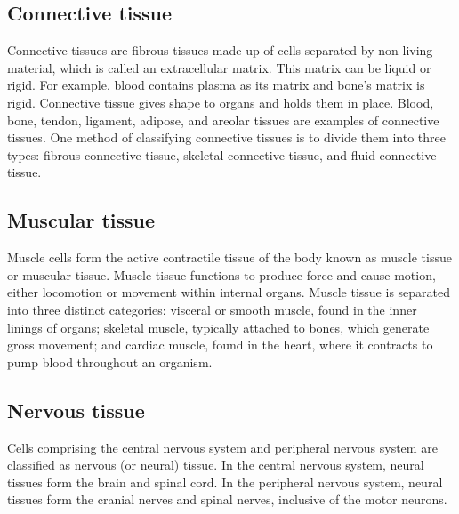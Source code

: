 \hypertarget{connective-tissue}{%
\subsection{Connective tissue}\label{connective-tissue}}

Connective tissues are fibrous tissues made up of cells separated by non-living material, which is called an extracellular matrix. This matrix can be liquid or rigid. For example, blood contains plasma as its matrix and bone's matrix is rigid. Connective tissue gives shape to organs and holds them in place. Blood, bone, tendon, ligament, adipose, and areolar tissues are examples of connective tissues. One method of classifying connective tissues is to divide them into three types: fibrous connective tissue, skeletal connective tissue, and fluid connective tissue.

\hypertarget{muscular-tissue}{%
\subsection{Muscular tissue}\label{muscular-tissue}}

Muscle cells form the active contractile tissue of the body known as muscle tissue or muscular tissue. Muscle tissue functions to produce force and cause motion, either locomotion or movement within internal organs. Muscle tissue is separated into three distinct categories: visceral or smooth muscle, found in the inner linings of organs; skeletal muscle, typically attached to bones, which generate gross movement; and cardiac muscle, found in the heart, where it contracts to pump blood throughout an organism.

\hypertarget{nervous-tissue}{%
\subsection{Nervous tissue}\label{nervous-tissue}}

Cells comprising the central nervous system and peripheral nervous system are classified as nervous (or neural) tissue. In the central nervous system, neural tissues form the brain and spinal cord. In the peripheral nervous system, neural tissues form the cranial nerves and spinal nerves, inclusive of the motor neurons.

